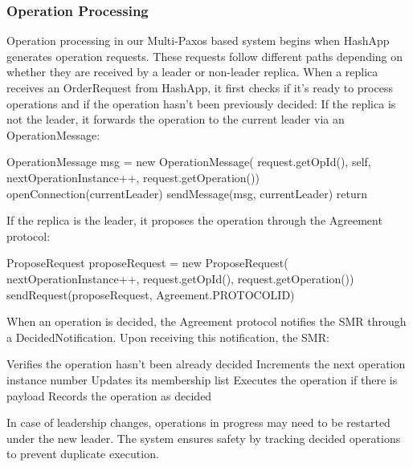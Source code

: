 \documentclass[10pt,a4paper,twocolumn]{article}
\begin{document}
\subsubsection{Operation Processing}
Operation processing in our Multi-Paxos based system begins when HashApp generates operation requests. These requests follow different paths depending on whether they are received by a leader or non-leader replica. When a replica receives an OrderRequest from HashApp, it first checks if it's ready to process operations and if the operation hasn't been previously decided:
If the replica is not the leader, it forwards the operation to the current leader via an OperationMessage:
\begin{algorithm}[H]
	\begin{algorithmic}
		\State OperationMessage msg = new OperationMessage(
		\State \hspace{1em}request.getOpId(), self,
		\State \hspace{1em}nextOperationInstance++,
		\State \hspace{1em}request.getOperation())
		\State openConnection(currentLeader)
		\State sendMessage(msg, currentLeader)
		\State return
		\EndIf
	\end{algorithmic}
\end{algorithm}
If the replica is the leader, it proposes the operation through the Agreement protocol:
\begin{algorithm}[H]
	\begin{algorithmic}
		\State ProposeRequest proposeRequest = new ProposeRequest(
		\State \hspace{1em}nextOperationInstance++,
		\State \hspace{1em}request.getOpId(),
		\State \hspace{1em}request.getOperation())
		\State sendRequest(proposeRequest, Agreement.PROTOCOLID)
	\end{algorithmic}
\end{algorithm}
When an operation is decided, the Agreement protocol notifies the SMR through a DecidedNotification. Upon receiving this notification, the SMR:

Verifies the operation hasn't been already decided
Increments the next operation instance number
Updates its membership list
Executes the operation if there is payload
Records the operation as decided

In case of leadership changes, operations in progress may need to be restarted under the new leader. The system ensures safety by tracking decided operations to prevent duplicate execution.
\end{document}
